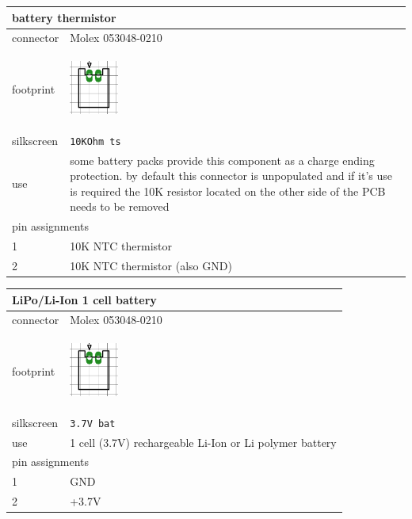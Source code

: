 \documentclass[a4paper,twoside]{refart}
\begin{document}
\begin{tabular}{ |l|p{8cm}| }
    \hline
    \multicolumn{2}{|l|}{battery thermistor} \\
    \hline
        connector & Molex 053048-0210 \\
        footprint & \begin{center} \includegraphics[height=50pt]{img/con2} \end{center} \\ \hline
        silkscreen & \verb"10KOhm ts" \\ \hline
        use & some battery packs provide this component as a charge ending protection. by default this connector is unpopulated and if it's use is required the 10K resistor located on the other side of the PCB needs to be removed \\
    \hline
    \multicolumn{2}{|l|}{pin assignments} \\
    \hline
        1   &   10K NTC thermistor \\
        2   &   10K NTC thermistor (also GND)\\
    \hline
\end{tabular}

\begin{tabular}{ |l|p{8cm}| }
    \hline
    \multicolumn{2}{|l|}{LiPo/Li-Ion 1 cell battery} \\
    \hline
        connector & Molex 053048-0210 \\
        footprint & \begin{center} \includegraphics[height=50pt]{img/con2} \end{center} \\ \hline
        silkscreen & \verb"3.7V bat"  \\ \hline
        use & 1 cell (3.7V) rechargeable Li-Ion or Li polymer battery \\
    \hline
    \multicolumn{2}{|l|}{pin assignments} \\
    \hline
        1   &   GND \\
        2   &   +3.7V \\
    \hline
\end{tabular}
\end{document}
